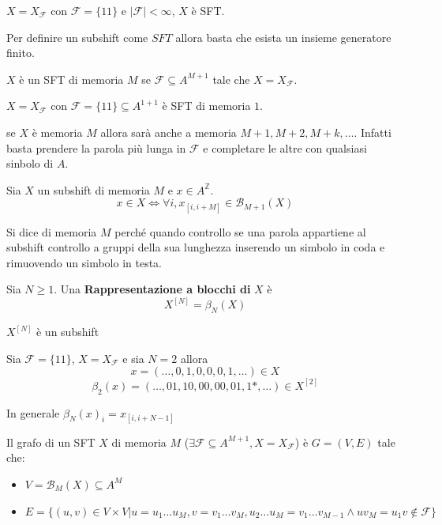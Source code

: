 \begin{esempio}
    $X=X_\mathcal{F}$ con $\mathcal{F} = \{11\}$ e $|\mathcal{F}|<\infty$, $X$ è
    SFT.
\end{esempio}

Per definire un subshift come $SFT$ allora basta che esista un insieme generatore
finito.
\begin{definizione}
    $X$ è un SFT di memoria $M$ se  $\mathcal{F}\subseteq A^{M+1}$ tale che $X=X_\mathcal{F}$.
\end{definizione}

\begin{esempio}
    $X=X_\mathcal{F}$ con $\mathcal{F} = \{11\}\subseteq A^{1+1}$ è
    SFT di memoria $1$.
\end{esempio}

\begin{nota}
    se $X$ è memoria $M$ allora sarà anche a memoria $M+1,M+2,M+k,\dots$. Infatti 
    basta prendere la parola più lunga in $\mathcal{F}$ e completare le altre 
    con qualsiasi sinbolo di $A$.
\end{nota}

\begin{teorema}
    Sia $X$ un subshift di memoria $M$ e $x\in A^{\mathbb{Z}}$.
    $$x\in X\iff \forall i, x_{[i,i+M]}\in \mathcal{B}_{M+1}(X)$$
\end{teorema}
Si dice di memoria $M$ perché quando controllo se una parola appartiene al subshift
controllo a gruppi della sua lunghezza inserendo un simbolo in coda e rimuovendo un 
simbolo in testa.

\begin{definizione}  
    Sia $N\ge 1$. Una \textbf{Rappresentazione a blocchi di} $X$ è 
    $$X^{[N]} =\beta_N (X)$$
\end{definizione}

\begin{teorema}
    $X^{[N]} $ è un subshift
\end{teorema}

\begin{esempio}
    Sia $\mathcal{F}=\{11\}$, $X = X_\mathcal{F}$ e sia $N=2$ allora 
    $$x=(\dots, 0,1,0,0,0,1,\dots)\in X$$
    $$\beta_2(x)=(\dots, 01,10,00,00,01,1\ast,\dots)\in X^{[2]}$$

    In generale $\beta_N(x)_i = x_{[i, i+N-1]}$
\end{esempio}

\begin{definizione} 
    Il grafo di un SFT $X$ di memoria $M$ ($\exists \mathcal{F}\subseteq A^{M+1}, X= X_\mathcal{F}$) 
    è $G=(V,E)$ tale che:
    \begin{itemize}
        \item $V = \mathcal{B}_M(X)\subseteq A^M$
        \item $E = \{(u,v)\in V\times V | u = u_1\dots u_M, v= v_1\dots v_M,u_2\dots u_M = v_1\dots v_{M-1}\land uv_M= u_1v \not \in \mathcal{F}\}$ 
    \end{itemize}
\end{definizione}

